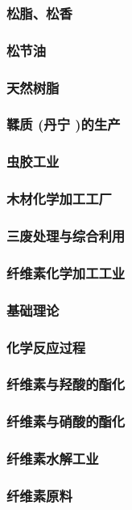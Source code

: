 \documentclass[UTF8]{../../ApplicationUniverse}
\begin{document}
            \subsubsection{松脂、松香}
            \subsubsection{松节油}
            \subsubsection{天然树脂}
    \subsubsection{鞣质 (丹宁 )的生产}
    \subsubsection{虫胶工业}
    \subsubsection{木材化学加工工厂}
    \subsubsection{三废处理与综合利用}
\subsubsection{纤维素化学加工工业}
    \subsubsection{基础理论}
    \subsubsection{化学反应过程}
        \subsubsection{纤维素与羟酸的酯化}
        \subsubsection{纤维素与硝酸的酯化}
        \subsubsection{纤维素水解工业}
    \subsubsection{纤维素原料}
\end{document}
